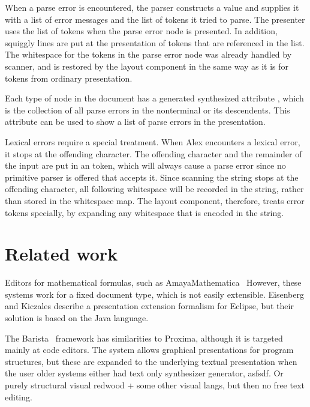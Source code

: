 \documentclass[12pt]{article}
\begin{document}
When a parse error is encountered, the parser constructs a  value and supplies it with a list of error messages and the list of tokens it tried to parse. The presenter uses the list of tokens when the parse error node is presented. In addition, squiggly lines are put at the presentation of tokens that are referenced in the  list. The whitespace for the tokens in the parse error node was already handled by scanner, and is restored by the layout component in the same way as it is for tokens from ordinary presentation.

Each type of node in the document has a generated synthesized attribute , which is the collection of all parse errors in the nonterminal or its descendents. This attribute can be used to show a list of parse errors in the presentation. 


Lexical errors require a special treatment. When Alex encounters a lexical error, it stops at the offending character. The offending character and the remainder of the input are put in an  token, which will always cause a parse error since no primitive parser is offered that accepts it. Since scanning the string stops at the offending character, all following whitespace  will be recorded in the string, rather than stored in the whitespace map. The layout component, therefore, treats error tokens specially, by expanding any whitespace that is encoded in the string. %






%
\section{Related work}\label{sect:relatedWork}
%



Editors for mathematical formulas, such as AmayaMathematica~\cite{mathematica} However, these systems work for a fixed document type, which is not easily extensible. Eisenberg and Kiczales describe a presentation extension formalism for Eclipse, but their solution is based on the Java language.

The Barista~\cite{KoMyers06Barista} framework has similarities to Proxima, although it is targeted mainly at code editors. The system allows graphical presentations for program structures, but these are expanded to the underlying textual presentation when the user 
\bc
older systems either had text only synthesizer generator, asfsdf. Or purely structural visual redwood + some other visual langs, but then no free text editing.
\end{document}
